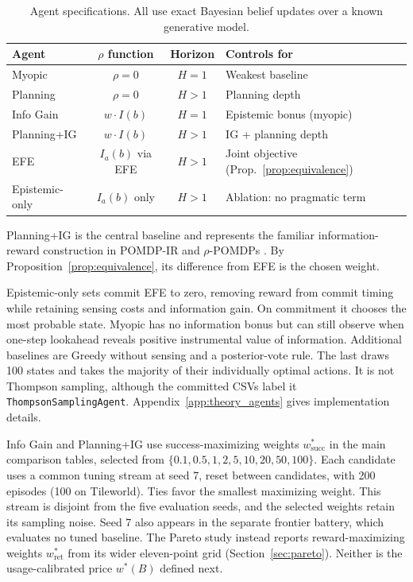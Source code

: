 \documentclass[runningheads]{llncs}
\newcommand{\tablefontsize}{\fontsize{9}{11}\selectfont\setlength{\tabcolsep}{3pt}}
\newenvironment{tablebody}{\tablefontsize}{}
\begin{document}
\begin{table}[ht]
\centering
\caption{Agent specifications. All use exact Bayesian belief updates over a known generative model.}
\label{tab:agents}
\begin{tablebody}
\begin{tabular}{lccl}
\toprule
Agent & $\rho$ function & Horizon & Controls for \\
\midrule
Myopic & $\rho = 0$ & $H{=}1$ & Weakest baseline \\
Planning & $\rho = 0$ & $H > 1$ & Planning depth \\
Info Gain & $w \cdot I(b)$ & $H{=}1$ & Epistemic bonus (myopic) \\
Planning+IG & $w \cdot I(b)$ & $H > 1$ & IG + planning depth \\
EFE & $I_a(b)$ via EFE & $H > 1$ & Joint objective (Prop.~\ref{prop:equivalence}) \\
Epistemic-only & $I_a(b)$ only & $H > 1$ & Ablation: no pragmatic term \\
\bottomrule
\end{tabular}
\end{tablebody}
\end{table}

Planning+IG is the central baseline and represents the familiar information-reward construction in POMDP-IR and $\rho$-POMDPs \citep{spaan2015,araya2010,satsangi2018}. By Proposition~\ref{prop:equivalence}, its difference from EFE is the chosen weight.

Epistemic-only sets commit EFE to zero, removing reward from commit timing while retaining sensing costs and information gain. On commitment it chooses the most probable state. Myopic has no information bonus but can still observe when one-step lookahead reveals positive instrumental value of information. Additional baselines are Greedy without sensing and a posterior-vote rule. The last draws 100 states and takes the majority of their individually optimal actions. It is not Thompson sampling, although the committed CSVs label it \texttt{ThompsonSamplingAgent}. Appendix~\ref{app:theory_agents} gives implementation details.

Info Gain and Planning+IG use success-maximizing weights $w^*_{\mathrm{succ}}$ in the main comparison tables, selected from $\{0.1,0.5,1,2,5,10,20,50,100\}$. Each candidate uses a common tuning stream at seed 7, reset between candidates, with 200 episodes (100 on Tileworld). Ties favor the smallest maximizing weight. This stream is disjoint from the five evaluation seeds, and the selected weights retain its sampling noise. Seed 7 also appears in the separate frontier battery, which evaluates no tuned baseline. The Pareto study instead reports reward-maximizing weights $w^*_{\mathrm{ret}}$ from its wider eleven-point grid (Section~\ref{sec:pareto}). Neither is the usage-calibrated price $w^*(B)$ defined next.
\end{document}
